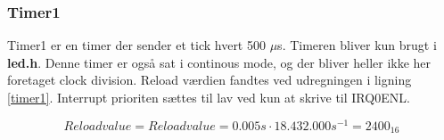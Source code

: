 \subsubsection{Timer1}
Timer1 er en timer der sender et tick hvert 500 $\mu$s. Timeren bliver kun brugt i \textbf{led.h}. Denne timer er også sat i continous mode, og der bliver heller ikke her foretaget clock division. Reload værdien fandtes ved udregningen i ligning \ref{timer1}. Interrupt prioriten sættes til lav ved kun at skrive til IRQ0ENL.

\begin{equation}
\label{timer1}
Reloadvalue = Reloadvalue = 0.005 \si{s} \cdot 18.432.000 \si{s^{-1}} = 2400_{16}  
\end{equation}
